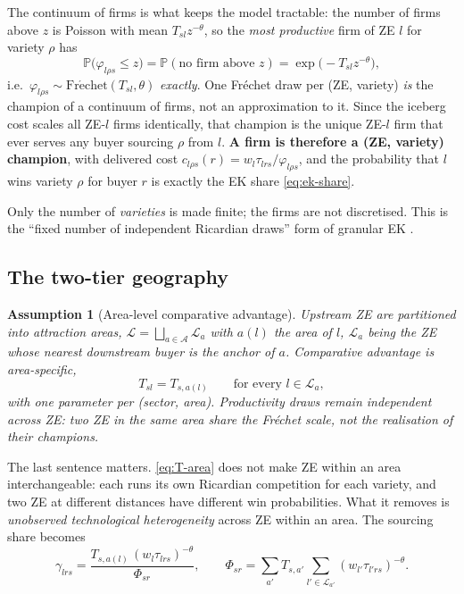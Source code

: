 \documentclass[11pt]{article}
\newtheorem{assumption}{Assumption}
\newcommand{\Prob}{\mathbb{P}}
\newcommand{\Frechet}{\mathrm{Fr\acute{e}chet}}
\newcommand{\Areas}{\mathcal{A}}
\begin{document}
The continuum of firms is what keeps the model tractable: the number of firms above $z$ is Poisson
with mean $T_{sl}z^{-\theta}$, so the \emph{most productive} firm of ZE $l$ for variety $\rho$ has
\begin{equation}
\Prob\big(\varphi_{l\rho s}\le z\big)=\Prob(\text{no firm above }z)=\exp\!\big(-T_{sl}z^{-\theta}\big),
\label{eq:champion}
\end{equation}
i.e.\ $\varphi_{l\rho s}\sim\Frechet(T_{sl},\theta)$ \emph{exactly}. One Fr\'echet draw per
(ZE, variety) \emph{is} the champion of a continuum of firms, not an approximation to it. Since
the iceberg cost scales all ZE-$l$ firms identically, that champion is the unique ZE-$l$ firm that
ever serves any buyer sourcing $\rho$ from $l$. \textbf{A firm is therefore a (ZE, variety)
champion}, with delivered cost $c_{l\rho s}(r)=w_{l}\tau_{lrs}/\varphi_{l\rho s}$, and the
probability that $l$ wins variety $\rho$ for buyer $r$ is exactly the EK share
\eqref{eq:ek-share}.

Only the number of \emph{varieties} is made finite; the firms are not discretised. This is the
``fixed number of independent Ricardian draws'' form of granular EK \citep[cf.][]{eks2012,bejk2003}.

\subsection{The two-tier geography}

\begin{assumption}[Area-level comparative advantage]
\label{as:geo}
Upstream ZE are partitioned into attraction areas, $\mathcal{L}=\bigsqcup_{a\in\Areas}\mathcal{L}_{a}$
with $a(l)$ the area of $l$, $\mathcal{L}_{a}$ being the ZE whose nearest downstream buyer is the
anchor of $a$. Comparative advantage is area-specific,
\begin{equation}
T_{sl}=T_{s,a(l)}\qquad\text{for every } l\in\mathcal{L}_{a},
\label{eq:T-area}
\end{equation}
with one parameter per (sector, area). Productivity draws remain \emph{independent across ZE}: two
ZE in the same area share the Fr\'echet \emph{scale}, not the realisation of their champions.
\end{assumption}

The last sentence matters. \eqref{eq:T-area} does not make ZE within an area interchangeable: each
runs its own Ricardian competition for each variety, and two ZE at different distances have
different win probabilities. What it removes is \emph{unobserved technological heterogeneity}
across ZE within an area. The sourcing share becomes
\begin{equation}
\gamma_{lrs}=\frac{T_{s,a(l)}\,(w_{l}\tau_{lrs})^{-\theta}}{\Phi_{sr}},
\qquad
\Phi_{sr}=\sum_{a'}T_{s,a'}\sum_{l'\in\mathcal{L}_{a'}}(w_{l'}\tau_{l'rs})^{-\theta}.
\label{eq:share-area}
\end{equation}
\end{document}
